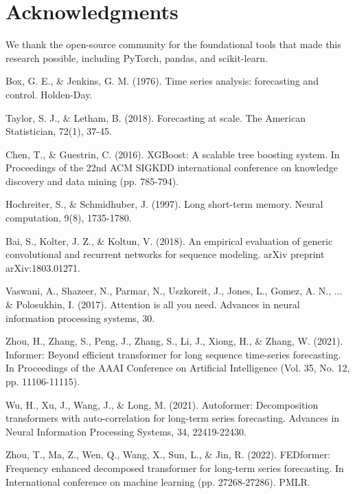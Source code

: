 \documentclass[11pt]{article}
\begin{document}
\section*{Acknowledgments}

We thank the open-source community for the foundational tools that made this research possible, including PyTorch, pandas, and scikit-learn.


\begin{thebibliography}{99}

Box, G. E., \& Jenkins, G. M. (1976). Time series analysis: forecasting and control. Holden-Day.

Taylor, S. J., \& Letham, B. (2018). Forecasting at scale. The American Statistician, 72(1), 37-45.

Chen, T., \& Guestrin, C. (2016). XGBoost: A scalable tree boosting system. In Proceedings of the 22nd ACM SIGKDD international conference on knowledge discovery and data mining (pp. 785-794).

Hochreiter, S., \& Schmidhuber, J. (1997). Long short-term memory. Neural computation, 9(8), 1735-1780.

Bai, S., Kolter, J. Z., \& Koltun, V. (2018). An empirical evaluation of generic convolutional and recurrent networks for sequence modeling. arXiv preprint arXiv:1803.01271.

Vaswani, A., Shazeer, N., Parmar, N., Uszkoreit, J., Jones, L., Gomez, A. N., ... \& Polosukhin, I. (2017). Attention is all you need. Advances in neural information processing systems, 30.

Zhou, H., Zhang, S., Peng, J., Zhang, S., Li, J., Xiong, H., \& Zhang, W. (2021). Informer: Beyond efficient transformer for long sequence time-series forecasting. In Proceedings of the AAAI Conference on Artificial Intelligence (Vol. 35, No. 12, pp. 11106-11115).

Wu, H., Xu, J., Wang, J., \& Long, M. (2021). Autoformer: Decomposition transformers with auto-correlation for long-term series forecasting. Advances in Neural Information Processing Systems, 34, 22419-22430.

Zhou, T., Ma, Z., Wen, Q., Wang, X., Sun, L., \& Jin, R. (2022). FEDformer: Frequency enhanced decomposed transformer for long-term series forecasting. In International conference on machine learning (pp. 27268-27286). PMLR.


\end{thebibliography}
\end{document}

